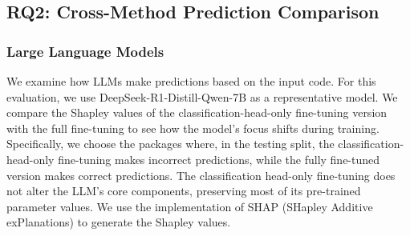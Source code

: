 \documentclass[12pt,openany,oneside,table]{cmuthesis}
\begin{document}
\subsection{RQ2: Cross-Method Prediction Comparison}
\label{subsec:rq3}

\subsubsection*{Large Language Models}

We examine how LLMs make predictions based on the input code. For this evaluation, we use DeepSeek-R1-Distill-Qwen-7B as a representative model. We compare the Shapley values of the classification-head-only fine-tuning version with the full fine-tuning to see how the model's focus shifts during training. 
Specifically, we choose the packages where, in the testing split, the classification-head-only fine-tuning makes incorrect predictions, while the fully fine-tuned version makes correct predictions.
The classification head-only fine-tuning does not alter the LLM’s core components, preserving most of its pre-trained parameter values. We use the implementation of SHAP (SHapley Additive exPlanations) \cite{NIPS2017_7062} to generate the Shapley values.
\end{document}
